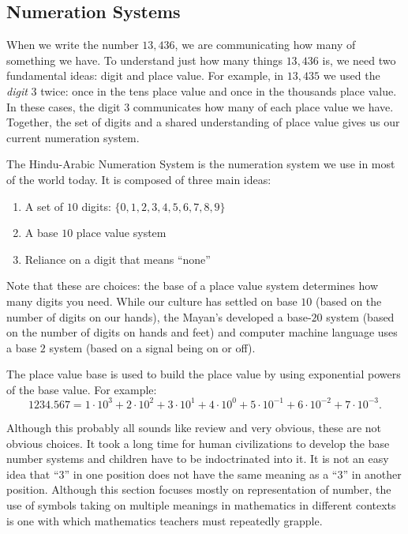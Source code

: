 \documentclass[
]{book}
\providecommand{\tightlist}{%
  \setlength{\itemsep}{0pt}\setlength{\parskip}{0pt}}
\theoremstyle{definition}
\theoremstyle{definition}
\theoremstyle{definition}
\theoremstyle{remark}
\begin{document}
\hypertarget{numeration-systems}{%
\subsection{Numeration Systems}\label{numeration-systems}}

When we write the number \(13,436\), we are communicating how many of something we have. To understand just how many things \(13,436\) is, we need two fundamental ideas: digit and place value. For example, in \(13,435\) we used the \textit{digit} \(3\) twice: once in the tens place value and once in the thousands place value. In these cases, the digit \(3\) communicates how many of each place value we have. Together, the set of digits and a shared understanding of place value gives us our current numeration system.

The Hindu-Arabic Numeration System is the numeration system we use in most of the world today. It is composed of three main ideas:

\begin{enumerate}
\def\labelenumi{\arabic{enumi}.}
\tightlist
\item
  A set of \(10\) digits: \(\{0,1,2,3,4,5,6,7,8,9\}\)
\item
  A base \(10\) place value system
\item
  Reliance on a digit that means ``none''
\end{enumerate}

Note that these are choices: the base of a place value system determines how many digits you need. While our culture has settled on base \(10\) (based on the number of digits on our hands), the Mayan's developed a base-\(20\) system (based on the number of digits on hands and feet) and computer machine language uses a base \(2\) system (based on a signal being on or off).

The place value base is used to build the place value by using exponential powers of the base value. For example:
\[1234.567 = 1 \cdot 10^3 + 2\cdot 10^2 + 3\cdot 10^1 + 4\cdot 10^0 + 5\cdot 10^{-1} + 6 \cdot 10^{-2} + 7 \cdot 10^{-3}.\]

Although this probably all sounds like review and very obvious, these are not obvious choices. It took a long time for human civilizations to develop the base number systems and children have to be indoctrinated into it. It is not an easy idea that ``3'' in one position does not have the same meaning as a ``3'' in another position. Although this section focuses mostly on representation of number, the use of symbols taking on multiple meanings in mathematics in different contexts is one with which mathematics teachers must repeatedly grapple.
\end{document}
